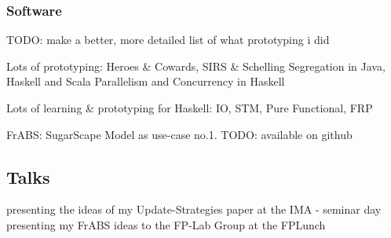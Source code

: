 \subsubsection{Software}
TODO: make a better, more detailed list of what prototyping i did

Lots of prototyping:
Heroes \& Cowards, SIRS \& Schelling Segregation in Java, Haskell and Scala
Parallelism and Concurrency in Haskell

Lots of learning \& prototyping for Haskell:
IO, STM, Pure Functional, FRP

FrABS: SugarScape Model as use-case no.1. TODO: available on github

\subsection{Talks}
presenting the ideas of my Update-Strategies paper at the IMA - seminar day
presenting my FrABS ideas to the FP-Lab Group at the FPLunch
